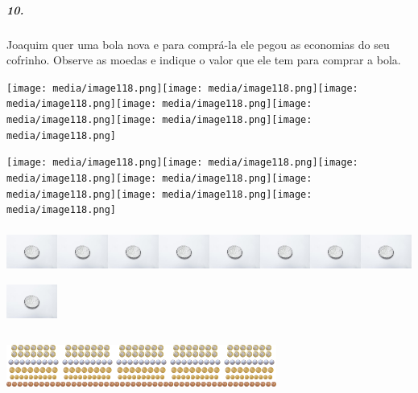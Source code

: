 \subparagraph{10. }\label{section-109}

Joaquim quer uma bola nova e para comprá-la ele pegou as economias do
seu cofrinho. Observe as moedas e indique o valor que ele tem para
comprar a bola.

\texttt{[image: media/image118.png]}\texttt{[image: media/image118.png]}\texttt{[image: media/image118.png]}\texttt{[image: media/image118.png]}\texttt{[image: media/image118.png]}\texttt{[image: media/image118.png]}\texttt{[image: media/image118.png]}

\texttt{[image: media/image118.png]}\texttt{[image: media/image118.png]}\texttt{[image: media/image118.png]}\texttt{[image: media/image118.png]}\texttt{[image: media/image118.png]}\texttt{[image: media/image118.png]}\texttt{[image: media/image118.png]}

\includegraphics[width=0.65539in,height=0.60039in]{media/image119.jpeg}\includegraphics[width=0.65539in,height=0.60039in]{media/image119.jpeg}\includegraphics[width=0.65539in,height=0.60039in]{media/image119.jpeg}\includegraphics[width=0.65539in,height=0.60039in]{media/image119.jpeg}\includegraphics[width=0.65539in,height=0.60039in]{media/image119.jpeg}\includegraphics[width=0.65539in,height=0.60039in]{media/image119.jpeg}\includegraphics[width=0.65539in,height=0.60039in]{media/image119.jpeg}\includegraphics[width=0.65539in,height=0.60039in]{media/image119.jpeg}\includegraphics[width=0.65539in,height=0.60039in]{media/image119.jpeg}

\includegraphics[width=0.69797in,height=0.67970in]{media/image120.png}\includegraphics[width=0.69797in,height=0.67970in]{media/image120.png}\includegraphics[width=0.69797in,height=0.67970in]{media/image120.png}\includegraphics[width=0.69797in,height=0.67970in]{media/image120.png}\includegraphics[width=0.69797in,height=0.67970in]{media/image120.png}\includ